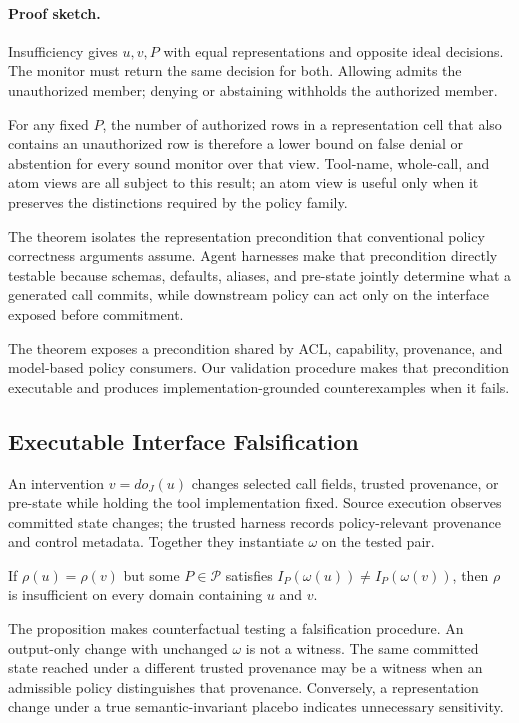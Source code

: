 \paragraph{Proof sketch.}
Insufficiency gives $u,v,P$ with equal representations and opposite ideal
decisions.  The monitor must return the same decision for both.  Allowing
admits the unauthorized member; denying or abstaining withholds the authorized
member.

For any fixed $P$, the number of authorized rows in a representation cell that
also contains an unauthorized row is therefore a lower bound on false denial
or abstention for every sound monitor over that view.  Tool-name, whole-call,
and atom views are all subject to this result; an atom view is useful only when
it preserves the distinctions required by the policy family.

The theorem isolates the representation precondition that conventional policy
correctness arguments assume.  Agent harnesses make that precondition directly
testable because schemas, defaults, aliases, and pre-state jointly determine
what a generated call commits, while downstream policy can act only on the
interface exposed before commitment.

The theorem exposes a precondition shared by ACL, capability, provenance, and
model-based policy consumers. Our validation procedure makes that precondition
executable and produces implementation-grounded counterexamples when it fails.

\subsection{Executable Interface Falsification}

An intervention $v=do_J(u)$ changes selected call fields, trusted provenance,
or pre-state while holding the tool implementation fixed.  Source execution
observes committed state changes; the trusted harness records policy-relevant
provenance and control metadata.  Together they instantiate $\omega$ on the
tested pair.

\begin{proposition}
\label{prop:mediation-gap}
If $\rho(u)=\rho(v)$ but some $P\in\mathcal P$ satisfies
$I_P(\omega(u))\ne I_P(\omega(v))$, then $\rho$ is insufficient on every domain
containing $u$ and $v$.
\end{proposition}

The proposition makes counterfactual testing a falsification procedure.  An
output-only change with unchanged $\omega$ is not a witness.  The same committed
state reached under a different trusted provenance may be a witness when an
admissible policy distinguishes that provenance.  Conversely, a representation
change under a true semantic-invariant placebo indicates unnecessary
sensitivity.

